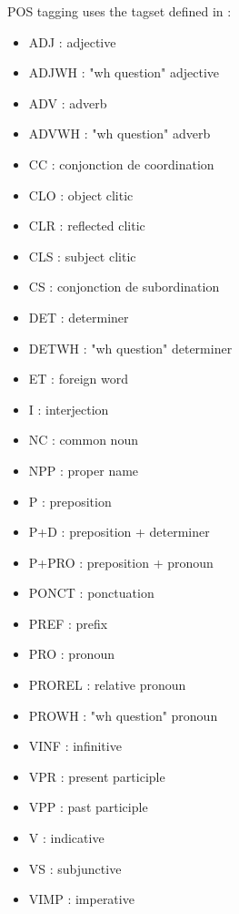 \documentclass[manual-fr.tex]{subfiles}
\begin{document}
POS tagging uses the tagset defined in \cite{Crabbe08} :\\

\begin{minipage}{0.49\linewidth}
	\begin{itemize}
		\item[] ADJ : adjective
		\item[] ADJWH : "wh question" adjective
		\item[] ADV : adverb
		\item[] ADVWH : "wh question" adverb
		\item[] CC : conjonction de coordination
		\item[] CLO : object clitic
		\item[] CLR : reflected clitic
		\item[] CLS : subject clitic
		\item[] CS : conjonction de subordination
		\item[] DET : determiner
		\item[] DETWH : "wh question" determiner 
		\item[] ET : foreign word
		\item[] I : interjection
		\item[] NC : common noun
		\item[] NPP : proper name
	\end{itemize}
\end{minipage}
\begin{minipage}{0.49\linewidth}
	\begin{itemize}
		\item[] P : preposition 
		\item[] P+D : preposition + determiner
		\item[] P+PRO : preposition + pronoun
		\item[] PONCT : ponctuation
		\item[] PREF : prefix
		\item[] PRO : pronoun 
		\item[] PROREL : relative pronoun 
		\item[] PROWH : "wh question" pronoun 
		\item[] VINF : infinitive
		\item[] VPR : present participle
		\item[] VPP : past participle
		\item[] V : indicative
		\item[] VS : subjunctive
		\item[] VIMP : imperative
	\end{itemize}
\end{minipage}
\end{document}
